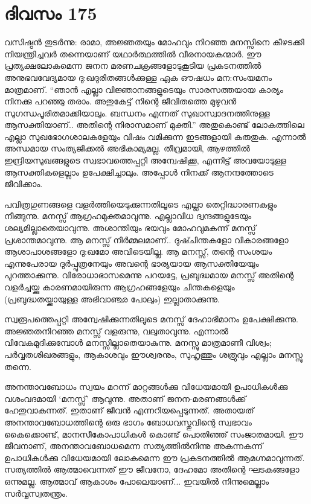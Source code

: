 \section{ദിവസം 175}


വസിഷ്ഠൻ തുടർന്നു: രാമാ, അജ്ഞതയും മോഹവും നിറഞ്ഞ മനസ്സിനെ കീഴടക്കി നിയന്ത്രിച്ചവർ തന്നെയാണ്‌ യഥാർത്ഥത്തിൽ വീരനായകന്മാർ. ഈ പ്രത്യക്ഷലോകമെന്ന ജനന മരണചക്രങ്ങളോടുകൂടിയ പ്രകടനത്തിൽ അനുഭവവേദ്യമായ ദു:ഖദുരിതങ്ങൾക്കുള്ള ഏക ഔഷധം മന:സംയമനം മാത്രമാണ്‌. “ഞാൻ എല്ലാ വിജ്ഞാനങ്ങളുടെയും സാരസത്തയായ കാര്യം നിനക്കു പറഞ്ഞു തരാം. അതുകേട്ട് നിന്റെ ജീവിതത്തെ മുഴുവൻ സുഗന്ധപൂരിതമാക്കിയാലും. ബന്ധനം എന്നത് സുഖാസ്വാദനത്തിനുള്ള ആസക്തിയാണ്‌.. അതിന്റെ നിരാസമാണ്‌ മുക്തി.” അതുകൊണ്ട് ലോകത്തിലെ എല്ലാ സുഖഭോഗശാലകളേയും വിഷം വമിക്കുന്ന ഇടങ്ങളായി കരുതുക. എന്നാൽ അന്ധമായ സംത്യജിക്കൽ അഭികാമ്യമല്ല. തീവ്രമായി, ആഴത്തിൽ ഇന്ദ്രിയസുഖങ്ങളുടെ സ്വഭാവത്തെപ്പറ്റി അന്വേഷിക്കൂ, എന്നിട്ട് അവയോടുള്ള ആസക്തികളെല്ലാം ഉപേക്ഷിച്ചാലും. അപ്പോൾ നിനക്ക് ആനന്ദത്തോടെ ജീവിക്കാം.

പവിത്രഗുണങ്ങളെ വളർത്തിയെടുക്കുന്നതിലൂടെ എല്ലാ തെറ്റിദ്ധാരണകളും നീങ്ങുന്നു. മനസ്സ് ആഗ്രഹമുക്തമാവുന്നു. എല്ലാവിധ ദ്വന്ദങ്ങളുടേയും ശല്യമില്ലാതെയാവുന്നു. അശാന്തിയും ഭയവും മോഹവുമകന്ന് മനസ്സ് പ്രശാന്തമാവുന്നു. ആ മനസ്സ് നിർമ്മലമാണ്‌.. ദുഷ്ചിന്തകളോ വികാരങ്ങളോ ആശാപാശങ്ങളോ ദു:ഖമോ അവിടെയില്ല. ആ മനസ്സ്, തന്റെ സംശയം എന്നുപേരായ ദുര്‍പ്പുത്രനേയും അവന്റെ ഭാര്യയായ ആസക്തിയേയും പുറത്താക്കുന്നു. വിരോധാഭാസമെന്നു പറയട്ടേ, പ്രബുദ്ധമായ മനസ്സ് അതിന്റെ വളർച്ചയ്ക്കു കാരണമായിരുന്ന ആഗ്രഹങ്ങളേയും ചിന്തകളെയും (പ്രബുദ്ധതയ്ക്കായുള്ള അഭിവാഞ്ഛ പോലും) ഇല്ലാതാക്കുന്നു.

സ്വരൂപത്തെപ്പറ്റി അന്വേഷിക്കുന്നതിലൂടെ മനസ്സ് ദേഹാഭിമാനം ഉപേക്ഷിക്കുന്നു. അജ്ഞതനിറഞ്ഞ മനസ്സ് വളരുന്നു, വലുതാവുന്നു. എന്നാൽ വിവേകമുദിക്കുമ്പോൾ മനസ്സില്ലാതെയാകുന്നു. മനസ്സു മാത്രമാണീ വിശ്വം; പർവ്വതശിഖരങ്ങളും, ആകാശവും ഈശ്വരനും, സുഹൃത്തും ശത്രുവും എല്ലാം മനസ്സു തന്നെ.

അനന്താവബോധം സ്വയം മറന്ന് മാറ്റങ്ങൾക്കു വിധേയമായി ഉപാധികൾക്കു വശംവദമായി ‘മനസ്സ്’ ആവുന്നു. അതാണ്‌ ജനന-മരണങ്ങൾക്ക് ഹേതുവാകുന്നത്. ഇതാണ്‌ ജീവൻ എന്നറിയപ്പെടുന്നത്. അതായത് അനന്താവബോധത്തിന്റെ ഒരു ഭാഗം ബോധവസ്തുവിന്റെ സ്വഭാവം കൈക്കൊണ്ട്, മാനസീകോപാധികൾ കൊണ്ട് പൊതിഞ്ഞ് സംജാതമായി. ഈ ജീവനാണ്‌, അനന്താവബോധമെന്ന സത്യത്തിൽനിന്നു അകന്നകന്ന് ഉപാധികൾക്കു വിധേയമായി ലോകമെന്ന ഈ പ്രകടനത്തിൽ ആമഗ്നമാവുന്നത്. സത്യത്തിൽ ആത്മാവെന്നത് ഈ ജീവനോ, ദേഹമോ അതിന്റെ ഘടകങ്ങളോ ഒന്നുമല്ല. ആത്മാവ് ആകാശം  പോലെയാണ്‌... ഇവയിൽ നിന്നുമെല്ലാം സർവ്വസ്വതന്ത്രം. 

